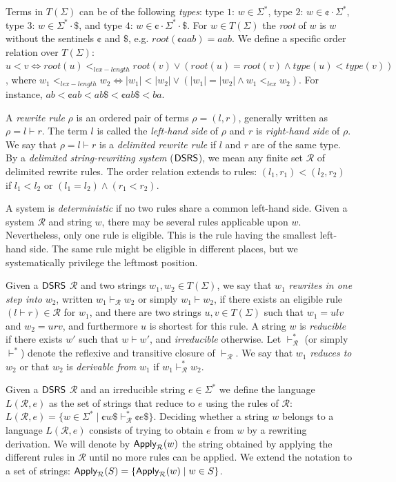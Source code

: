 Terms in $T(\Sigma)$ can be of the following \emph{types}: type $1$: $w \in \Sigma^*$, type $2$: $w \in \cent \cdot \Sigma^*$, type $3$: $w \in \Sigma^* \cdot \$$, and type $4$: $w \in \cent \cdot \Sigma^* \cdot \$$. For $w \in T(\Sigma)$ the \emph{root} of $w$ is $w$ without the sentinels $\cent$ and $\$$, e.g. $root(\cent aab) = aab$. We define a specific order relation over $T(\Sigma)$: $u < v \Leftrightarrow root(u) <_{lex-length} root(v) \vee (root(u) = root(v) \wedge type(u) < type(v))$, where $w_1 <_{lex-length} w_2 \Leftrightarrow |w_1| < |w_2| \vee (|w_1| = |w_2| \wedge w_1 <_{lex} w_2)$. For instance, $ab < \cent ab < ab \$ < \cent ab \$ < ba$.

A \emph{rewrite rule} $\rho$ is an ordered pair of terms $\rho = (l, r)$, generally written as $\rho = l \vdash r$. The term $l$ is called the \emph{left-hand side} of $\rho$ and $r$ is \emph{right-hand side} of $\rho$. We say that $\rho = l \vdash r$ is a \emph{delimited rewrite rule} if $l$ and $r$ are of the same type. By a \emph{delimited string-rewriting system} ($\mbox{\sf DSRS}$), we mean any finite set $\mathcal{R}$ of delimited rewrite rules. The order relation extends to rules: $(l_1, r_1) < (l_2, r_2)$ if $l_1 < l_2$ or $(l_1 = l_2) \wedge (r_1 < r_2)$.

A system is \emph{deterministic} if no two rules share a common left-hand side. Given a system $\mathcal{R}$ and string $w$, there may be several rules applicable upon $w$. Nevertheless, only one rule is eligible. This is the rule having the smallest left-hand side. The same rule might be eligible in different places, but we systematically privilege the leftmost position.

Given a $\mbox{\sf DSRS}$ $\mathcal{R}$ and two strings $w_1, w_2 \in T(\Sigma)$, we say that $w_1$ \emph{rewrites in one step into} $w_2$, written $w_1 \vdash_{\mathcal{R}} w_2$ or simply $w_1 \vdash w_2$, if there exists an eligible rule $(l \vdash r) \in \mathcal{R}$ for $w_1$, and there are two strings $u, v \in T(\Sigma)$ such that $w_1 = ulv$ and $w_2 = urv$, and furthermore $u$ is shortest for this rule. A string $w$ is \emph{reducible} if there exists $w'$ such that $w \vdash w'$, and \emph{irreducible} otherwise. Let $\vdash_{\mathcal{R}}^* $ (or simply $\vdash^*$) denote the reflexive and transitive closure of $\vdash_{\mathcal{R}}$. We say that $w_1$ \emph{reduces to} $w_2$ or that $w_2$ is \emph{derivable from} $w_1$ if $w_1 \vdash_{\mathcal{R}}^* w_2$.

Given a $\mbox{\sf DSRS}$ $\mathcal{R}$ and an irreducible string $e \in \Sigma^*$ we define the language $L(\mathcal{R}, e)$ as the set of strings that reduce to $e$ using the rules of $\mathcal{R}$: $L(\mathcal{R}, e) = \{ w \in \Sigma^* \mid \cent w \$ \vdash_{\mathcal{R}}^* \cent e \$ \}.$ Deciding whether a string $w$ belongs to a language $L(\mathcal{R}, e)$ consists of trying to obtain $e$ from $w$ by a rewriting derivation. We will denote by $\Apply_{\mathcal{R}}(w)$ the string obtained by applying the different rules in $\mathcal{R}$ until no more rules can be applied. We extend the notation to a set of strings: $\Apply_{\mathcal{R}}(S) = \{\Apply_{\mathcal{R}}(w) \mid w \in S\}$.

